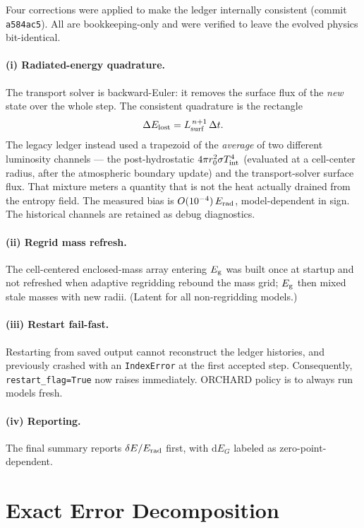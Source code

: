\documentclass{aastex631}
\newcommand{\Erad}{E_{\rm rad}}
\newcommand{\Eg}{E_{\rm g}}
\newcommand{\Elost}{E_{\rm lost}}
\newcommand{\Tint}{T_{\rm int}}
\newcommand{\dE}{\delta E}
\begin{document}
Four corrections were applied to make the ledger internally consistent
(commit \texttt{a584ac5}).  All are bookkeeping-only and were verified to
leave the evolved physics bit-identical.

\paragraph{(i) Radiated-energy quadrature.}
The transport solver is backward-Euler: it removes the surface flux of the
\emph{new} state over the whole step.  The consistent quadrature is the
rectangle
\begin{equation}
\Delta \Elost = L_{\rm surf}^{\,n+1}\,\Delta t .
\end{equation}
The legacy ledger instead used a trapezoid of the \emph{average} of two
different luminosity channels --- the post-hydrostatic
$4\pi r_0^2 \sigma \Tint^4$ (evaluated at a cell-center radius, after the
atmospheric boundary update) and the transport-solver surface flux.  That
mixture meters a quantity that is not the heat actually drained from the
entropy field.  The measured bias is $O(10^{-4})\,\Erad$, model-dependent
in sign.  The historical channels are retained as debug diagnostics.

\paragraph{(ii) Regrid mass refresh.}
The cell-centered enclosed-mass array entering $\Eg$ was built once at
startup and not refreshed when adaptive regridding rebound the mass grid;
$\Eg$ then mixed stale masses with new radii.  (Latent for all
non-regridding models.)

\paragraph{(iii) Restart fail-fast.}
Restarting from saved output cannot reconstruct the ledger histories, and
previously crashed with an \texttt{IndexError} at the first accepted step.
Consequently, \texttt{restart\_flag=True} now raises immediately.  ORCHARD
policy is to always run models fresh.

\paragraph{(iv) Reporting.}
The final summary reports $\dE/\Erad$ first, with $\mathrm{d}E_G$ labeled
as zero-point-dependent.

\section{Exact Error Decomposition}
\label{sec:decomposition}
\end{document}
